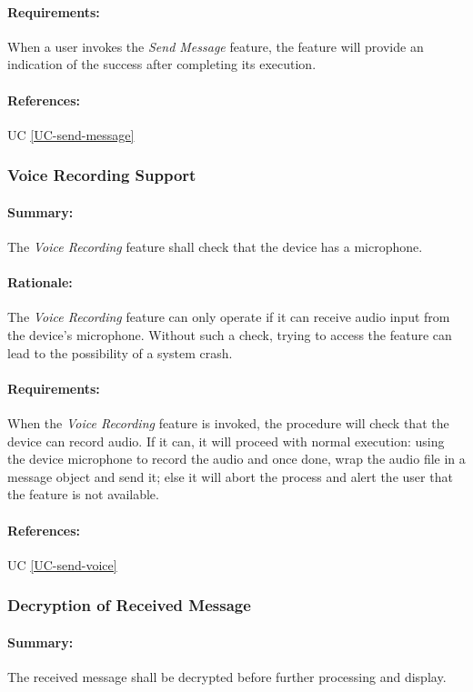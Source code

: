 \documentclass[11pt]{article}
\begin{document}
\paragraph{Requirements:} When a user invokes the \textit{Send Message} feature, the feature will provide an indication of the success after completing its execution.
\paragraph{References:} UC \ref{UC-send-message}

\subsubsection{Voice Recording Support} \label{FR-voice-record-support}
\paragraph{Summary:} The \textit{Voice Recording} feature shall check that the device has a microphone.
\paragraph{Rationale:} The \textit{Voice Recording} feature can only operate if it can receive audio input from the device's microphone. Without such a check, trying to access the feature can lead to the possibility of a system crash.
\paragraph{Requirements:} When the \textit{Voice Recording} feature is invoked, the procedure will check that the device can record audio. If it can, it will proceed with normal execution: using the device microphone to record the audio and once done, wrap the audio file in a message object and send it; else it will abort the process and alert the user that the feature is not available.
\paragraph{References:} UC \ref{UC-send-voice}

\subsubsection{Decryption of Received Message} \label{FR-decrypt-received-message}
\paragraph{Summary:} The received message shall be decrypted before further processing and display.
\end{document}
